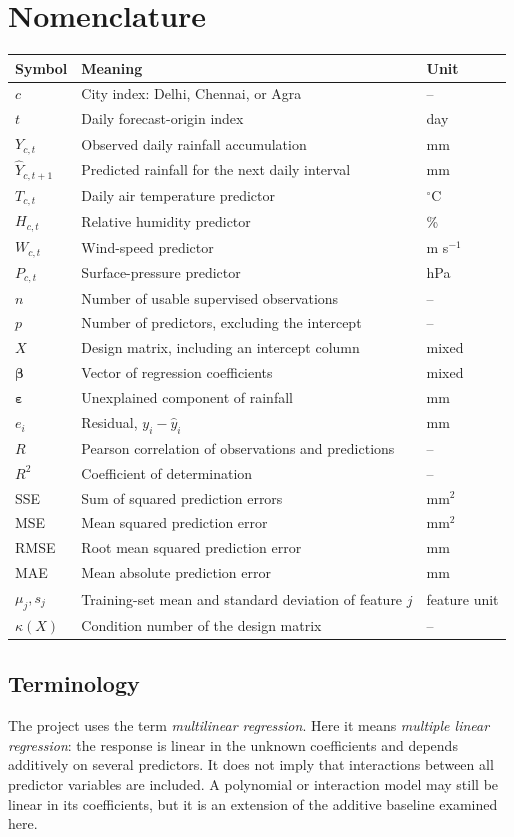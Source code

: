 \documentclass[11pt,a4paper]{article}
\begin{document}
\section*{Nomenclature}
\begin{tabularx}{\textwidth}{@{}lXl@{}}\toprule
Symbol & Meaning & Unit \\\midrule
$c$ & City index: Delhi, Chennai, or Agra & --\\
$t$ & Daily forecast-origin index & day\\
$Y_{c,t}$ & Observed daily rainfall accumulation & mm\\
$\widehat Y_{c,t+1}$ & Predicted rainfall for the next daily interval & mm\\
$T_{c,t}$ & Daily air temperature predictor & $^\circ$C\\
$H_{c,t}$ & Relative humidity predictor & \%\\
$W_{c,t}$ & Wind-speed predictor & m s$^{-1}$\\
$P_{c,t}$ & Surface-pressure predictor & hPa\\
$n$ & Number of usable supervised observations & --\\
$p$ & Number of predictors, excluding the intercept & --\\
$X$ & Design matrix, including an intercept column & mixed\\
$\boldsymbol\beta$ & Vector of regression coefficients & mixed\\
$\boldsymbol\varepsilon$ & Unexplained component of rainfall & mm\\
$e_i$ & Residual, $y_i-\widehat y_i$ & mm\\
$R$ & Pearson correlation of observations and predictions & --\\
$R^2$ & Coefficient of determination & --\\
SSE & Sum of squared prediction errors & mm$^2$\\
MSE & Mean squared prediction error & mm$^2$\\
RMSE & Root mean squared prediction error & mm\\
MAE & Mean absolute prediction error & mm\\
$\mu_j,s_j$ & Training-set mean and standard deviation of feature $j$ & feature unit\\
$\kappa(X)$ & Condition number of the design matrix & --\\
\bottomrule\end{tabularx}

\subsection*{Terminology}
The project uses the term \emph{multilinear regression}. Here it means \emph{multiple linear regression}: the response is linear in the unknown coefficients and depends additively on several predictors. It does not imply that interactions between all predictor variables are included. A polynomial or interaction model may still be linear in its coefficients, but it is an extension of the additive baseline examined here.
\end{document}
